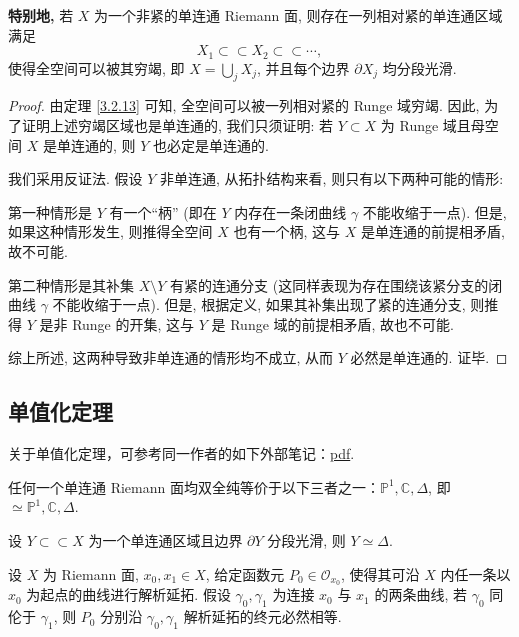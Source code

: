 \textbf{特别地,} 若 $X$ 为一个非紧的单连通 Riemann 面, 则存在一列相对紧的单连通区域满足 
\[ X_1 \subset\subset X_2 \subset\subset \cdots, \]
使得全空间可以被其穷竭, 即 $X = \bigcup_j X_j$, 并且每个边界 $\partial X_j$ 均分段光滑.

\begin{proof}
由定理 \ref{3.2.13} 可知, 全空间可以被一列相对紧的 Runge 域穷竭. 因此, 为了证明上述穷竭区域也是单连通的, 我们只须证明: 若 $Y \subset X$ 为 Runge 域且母空间 $X$ 是单连通的, 则 $Y$ 也必定是单连通的.

我们采用反证法. 假设 $Y$ 非单连通, 从拓扑结构来看, 则只有以下两种可能的情形:

第一种情形是 $Y$ 有一个“柄” (即在 $Y$ 内存在一条闭曲线 $\gamma$ 不能收缩于一点). 但是, 如果这种情形发生, 则推得全空间 $X$ 也有一个柄, 这与 $X$ 是单连通的前提相矛盾, 故不可能.

第二种情形是其补集 $X \setminus Y$ 有紧的连通分支 (这同样表现为存在围绕该紧分支的闭曲线 $\gamma$ 不能收缩于一点). 但是, 根据定义, 如果其补集出现了紧的连通分支, 则推得 $Y$ 是非 Runge 的开集, 这与 $Y$ 是 Runge 域的前提相矛盾, 故也不可能.

综上所述, 这两种导致非单连通的情形均不成立, 从而 $Y$ 必然是单连通的. 证毕.
\end{proof}

\subsection{单值化定理}
关于单值化定理，可参考同一作者的如下外部笔记：\href{https://liquid-geo.github.io/Kewei.github.io/Complex\%20Geometry.pdf}{pdf}.

\begin{theorem}
任何一个单连通 Riemann 面均双全纯等价于以下三者之一：$\mathbb{P}^1, \mathbb{C}, \Delta$, 即 $\simeq \mathbb{P}^1, \mathbb{C}, \Delta$.
\end{theorem}

\begin{lemma}[Riemann]\label{3.3.2}
设 $Y \subset\subset X$ 为一个单连通区域且边界 $\partial Y$ 分段光滑, 则 $Y \simeq \Delta$.
\end{lemma}

\begin{theorem}
设 $X$ 为 Riemann 面,  $x_0, x_1 \in X$, 给定函数元 $P_0 \in \mathcal{O}_{x_0}$, 使得其可沿 $X$ 内任一条以 $x_0$ 为起点的曲线进行解析延拓. 假设 $\gamma_0, \gamma_1$ 为连接 $x_0$ 与 $x_1$ 的两条曲线, 若 $\gamma_0$ 同伦于 $\gamma_1$, 则 $P_0$ 分别沿 $\gamma_0, \gamma_1$ 解析延拓的终元必然相等.
\end{theorem}


